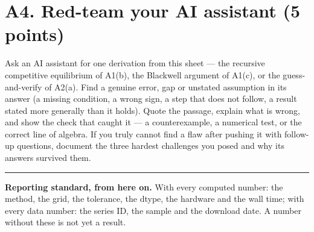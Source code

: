 \documentclass[11pt]{article}
\newif\ifsolutions \solutionsfalse
\newcommand{\solution}[1]{\ifsolutions\medskip
  {\color{blue!45!black}\textbf{Solution.} #1}\medskip\fi}
\begin{document}
\section*{A4. Red-team your AI assistant (5 points)}

Ask an AI assistant for one derivation from this sheet --- the recursive competitive equilibrium of
A1(b), the Blackwell argument of A1(c), or the guess-and-verify of A2(a). Find a genuine error,
gap or unstated assumption in its answer (a missing condition, a wrong sign, a step that does not
follow, a result stated more generally than it holds). Quote the passage, explain what is wrong,
and show the check that caught it --- a counterexample, a numerical test, or the correct line of
algebra. If you truly cannot find a flaw after pushing it with follow-up questions, document the
three hardest challenges you posed and why its answers survived them.

\solution{\keyAtwelve}

\vfill
\noindent\rule{\linewidth}{0.4pt}\par
\small
\textbf{Reporting standard, from here on.} With every computed number: the method, the grid, the
tolerance, the dtype, the hardware and the wall time; with every data number: the series ID, the
sample and the download date. A number without these is not yet a result.
\normalsize
\end{document}
